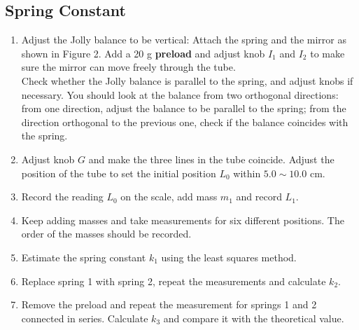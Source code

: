 \documentclass[12pt]{article}
\begin{document}
\subsection{Spring Constant}
\begin{enumerate}
\item Adjust the Jolly balance to be vertical: Attach the spring and the mirror as shown
in Figure 2. Add a 20 g \textbf{preload} and adjust knob $I_1$ and $I_2$ to make sure the mirror
can move freely through the tube.\\ 
Check whether the Jolly balance is parallel to the spring, and adjust knobs if necessary. You should look at the balance from two orthogonal directions: from one direction, adjust the balance to be parallel to the spring; from the direction orthogonal to the previous one, check if the balance coincides with the spring.
\item Adjust knob $G$ and make the three lines in the tube coincide. Adjust the position of the tube to set the initial position $L_0$ within $5.0\sim10.0$ cm.
\item Record the reading $L_0$ on the scale, add mass $m_1$ and record $L_1$.
\item Keep adding masses and take measurements for six different positions. The order
of the masses should be recorded.
\item Estimate the spring constant $k_1$ using the least squares method.
\item Replace spring 1 with spring 2, repeat the measurements and calculate $k_2$.
\item Remove the preload and repeat the measurement for springs 1 and 2 connected in series. Calculate $k_3$ and compare it with the theoretical value.
\end{enumerate}
\end{document}
